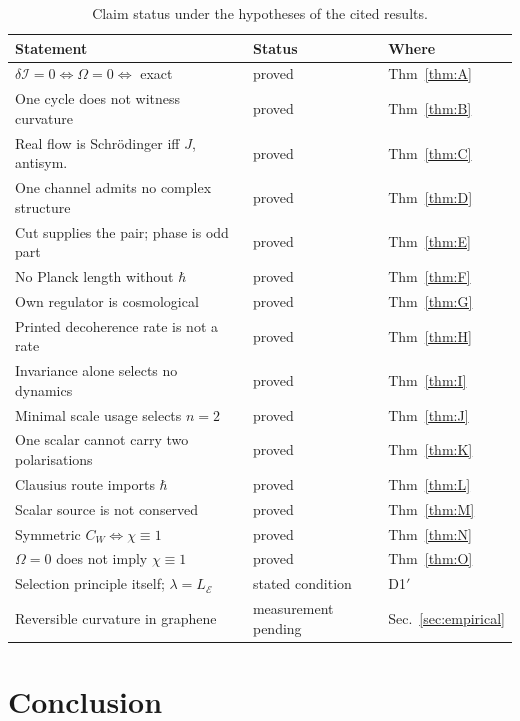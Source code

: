 \documentclass[aps,prd,twocolumn,superscriptaddress,nofootinbib]{revtex4-2}
\newcommand{\cI}{\mathcal{I}}
\newcommand{\cE}{\mathcal{E}}
\begin{document}
\begin{table}[t]
\centering
\begin{tabular}{lll}
\hline
Statement & Status & Where\\
\hline
$\delta\cI=0\Leftrightarrow\Omega=0\Leftrightarrow$ exact & proved & Thm~\ref{thm:A}\\
One cycle does not witness curvature & proved & Thm~\ref{thm:B}\\
Real flow is Schr\"odinger iff $J$, antisym. & proved & Thm~\ref{thm:C}\\
One channel admits no complex structure & proved & Thm~\ref{thm:D}\\
Cut supplies the pair; phase is odd part & proved & Thm~\ref{thm:E}\\
No Planck length without $\hbar$ & proved & Thm~\ref{thm:F}\\
Own regulator is cosmological & proved & Thm~\ref{thm:G}\\
Printed decoherence rate is not a rate & proved & Thm~\ref{thm:H}\\
Invariance alone selects no dynamics & proved & Thm~\ref{thm:I}\\
Minimal scale usage selects $n=2$ & proved & Thm~\ref{thm:J}\\
One scalar cannot carry two polarisations & proved & Thm~\ref{thm:K}\\
Clausius route imports $\hbar$ & proved & Thm~\ref{thm:L}\\
Scalar source is not conserved & proved & Thm~\ref{thm:M}\\
Symmetric $C_W\Leftrightarrow\chi\equiv1$ & proved & Thm~\ref{thm:N}\\
$\Omega=0$ does not imply $\chi\equiv1$ & proved & Thm~\ref{thm:O}\\
Selection principle itself; $\lambda=L_\cE$ & stated condition & D1$'$\\
Reversible curvature in graphene & measurement pending & Sec.~\ref{sec:empirical}\\
\hline
\end{tabular}
\caption{Claim status under the hypotheses of the cited results.}
\end{table}

\section{Conclusion}
\end{document}
